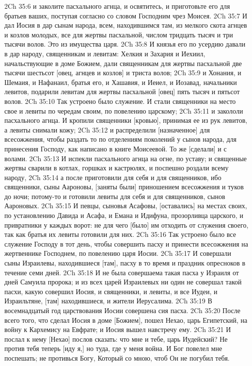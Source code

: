 2Ch 35:6  и заколите пасхального агнца, и освятитесь, и приготовьте его для братьев ваших, поступая согласно со словом Господним чрез Моисея.
2Ch 35:7  И дал Иосия в дар сынам народа, всем, находившимся там, из мелкого скота агнцев и козлов молодых, все для жертвы пасхальной, числом тридцать тысяч и три тысячи волов. Это из имущества царя.
2Ch 35:8  И князья его по усердию давали в дар народу, священникам и левитам: Хелкия и Захария и Иехиил, начальствующие в доме Божием, дали священникам для жертвы пасхальной две тысячи шестьсот [овец, агнцев и козлов] и триста волов;
2Ch 35:9  и Хонания, и Шемаия, и Нафанаил, братья его, и Хашавия, и Иеиел, и Иозавад, начальники левитов, подарили левитам для жертвы пасхальной [овец] пять тысяч и пятьсот волов.
2Ch 35:10  Так устроено было служение. И стали священники на место свое и левиты по чередам своим, по повелению царскому;
2Ch 35:11  и закололи пасхального агнца. И кропили священники [кровью], принимая ее из рук левитов, а левиты снимали кожу;
2Ch 35:12  и распределили [назначенное] для всесожжения, чтобы раздать то по отделениям поколений у сынов народа, для принесения Господу, как написано в книге Моисеевой. То же [сделали] и с волами.
2Ch 35:13  И испекли пасхального агнца на огне, по уставу; и священные жертвы сварили в котлах, горшках и кастрюлях, и поспешно роздали всему народу,
2Ch 35:14  а после приготовили для себя и для священников, ибо священники, сыны Аароновы, [заняты были] приношением всесожжения и туков до ночи; потому-то и готовили левиты для себя и для священников, сынов Аароновых.
2Ch 35:15  И певцы, сыновья Асафовы, [оставались] на местах своих, по установлению Давида и Асафа, и Емана и Идифуна, прозорливца царского, и привратники у каждых ворот: не для чего [было] им отходить от служения своего, так как братья их левиты готовили для них.
2Ch 35:16  Так устроено было все служение Господу в тот день, чтобы совершить пасху и принести всесожжения на жертвеннике Господнем, по повелению царя Иосии.
2Ch 35:17  И совершали сыны Израилевы, находившиеся [там], пасху в то время и праздник опресноков в течение семи дней.
2Ch 35:18  И не была совершаема такая пасха у Израиля от дней Самуила пророка; и из всех царей Израилевых ни один не совершал такой пасхи, какую совершил Иосия, и священники, и левиты, и все Иудеи, и Израильтяне, [там] находившиеся, и жители Иерусалима.
2Ch 35:19  В восемнадцатый год царствования Иосии совершена сия пасха.
2Ch 35:20  После всего того, что сделал Иосия в доме [Божием], пошел Нехао, царь Египетский, на войну к Кархемису на Евфрате; и Иосия вышел навстречу ему.
2Ch 35:21  И послал к нему [Нехао] послов сказать: что мне и тебе, царь Иудейский? Не против тебя теперь [иду я,] но туда, где у меня война. И Бог повелел мне поспешать; не противься Богу, Который со мною, чтоб Он не погубил тебя.
